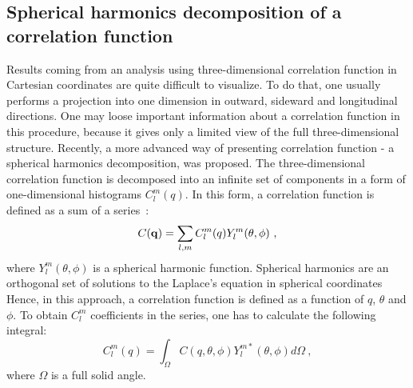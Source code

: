     \subsection{Spherical harmonics decomposition of a correlation function}
      Results coming from an analysis using three-dimensional correlation function in Cartesian coordinates are quite difficult to visualize.
      To do that, one usually performs a projection into one dimension in outward, sideward and longitudinal directions. 
      One may loose important information about a correlation function in this procedure, because it gives only a limited view of the full three-dimensional structure.
      Recently, a more advanced way of presenting correlation function - a spherical harmonics decomposition, was proposed.
      The three-dimensional correlation function is decomposed into an infinite set of components in a form of one-dimensional histograms $C^m_l (q)$.
      In this form, a correlation function is defined as a sum of a series~\cite{sh}:
      \begin{equation}
        C(\mathbf{q}) = \sum_{l,m} C^m_l (q) Y^m_l(\theta, \phi)~,
      \end{equation}
      where $Y^m_l(\theta,\phi)$ is a spherical harmonic function.
      Spherical harmonics are an orthogonal set of solutions to the Laplace's equation in spherical coordinates
      Hence, in this approach, a correlation function is defined as a function of $q$, $\theta$ and $\phi$.
      To obtain $C^m_l$ coefficients in the series, one has to calculate the following integral:
      \begin{equation}
        \label{eq:sh_decomposition}
        C^m_l(q) = \int_\Omega C(q,\theta,\phi) Y^{m*}_l (\theta,\phi) d \Omega~,
      \end{equation}
      where $\Omega$ is a full solid angle.


